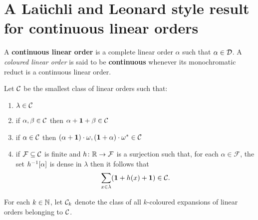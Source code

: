 \chapter{A La\"uchli and Leonard style result for continuous linear orders}

\begin{dfn}
	A \textbf{continuous linear order} is a complete linear order $\alpha$ such that $\alpha\in\mathcal{D}$.  A \textit{coloured linear order} is said to be \textbf{continuous} whenever its monochromatic reduct is a continuous linear order.
\end{dfn}

\begin{dfn}\label{dfn:C}
	Let $\mathcal{C}$ be the smallest class of linear orders such that:
	\begin{enumerate}
		\item	$\lambda\in\mathcal{C}$\label{dfn:C1}
		\item	if $\alpha,\beta\in\mathcal{C}$ then $\alpha+\mathbf{1}+\beta\in\mathcal{C}$\label{dfn:C2}
		\item	if $\alpha\in\mathcal{C}$ then $(\alpha+\mathbf{1})\cdot\omega,(\mathbf{1}+\alpha)\cdot{\omega}^\ast\in\mathcal{C}$\label{dfn:C3}
		\item	if $\mathcal{F}\subseteq\mathcal{C}$ is finite and $h\colon\mathbb{R}\to\mathcal{F}$ is a surjection such that, for each $\alpha\in\mathcal{F}$, the set ${h}^{-1}[\alpha]$ is dense in $\lambda$ then it follows that
			\begin{equation}
				\sum_{x\in\lambda}(\mathbf{1}+h(x)+\mathbf{1})\in\mathcal{C}.
			\end{equation}\label{dfn:C4}
	\end{enumerate}
\end{dfn}

\begin{dfn}
	For each $k\in\mathbb{N}$, let $\mathcal{C}_k$ denote the class of all $k$-coloured expansions of linear orders belonging to $\mathcal{C}$.
\end{dfn}

